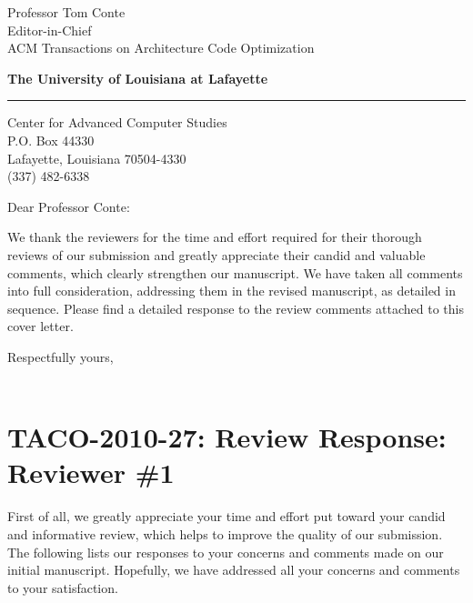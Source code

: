 \documentclass[10pt]{letter} %
\begin{document}
\longindentation=0pt                       %
\let\raggedleft\raggedright                %
 
 
\begin{letter}{Professor Tom Conte \\
Editor-in-Chief \\
ACM Transactions on Architecture Code Optimization }


\begin{flushright}
{\hfill \large\bf The University of Louisiana at Lafayette}
\end{flushright}
\medskip\hrule height 1pt
\begin{flushright}
\hfill Center for Advanced Computer Studies\\
\hfill P.O. Box 44330 \\
\hfill Lafayette, Louisiana 70504-4330\\
\hfill (337) 482-6338 \\
\hfill {}
\end{flushright} 

 
\opening{Dear Professor Conte:} 
 
\noindent We thank the reviewers for the time and effort required for
their thorough reviews of our submission and greatly appreciate their
candid and valuable comments, which clearly strengthen our manuscript.
We have taken all comments into full consideration, addressing them in
the revised manuscript, as detailed in sequence.  Please find a detailed
response to the review comments attached to this cover letter.
 
\closing{Respectfully yours, \\
 \\
}

\clearpage
\section{TACO-2010-27: Review Response: Reviewer \#1}
\label{sec-1}
First of all, we greatly appreciate your time and effort put toward
your candid and informative review, which helps to improve the quality
of our submission.  The following lists our responses to your concerns
and comments made on our initial manuscript.  Hopefully, we have addressed
all your concerns and comments to your satisfaction.


\end{letter}
\end{document}
